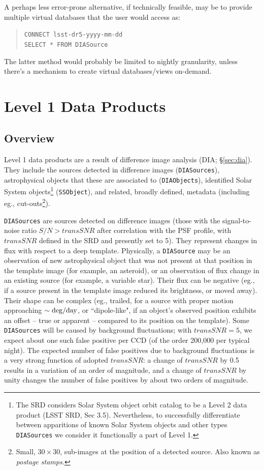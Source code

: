 \documentclass[12pt]{article}
\newcommand{\code}[1]{\texttt{#1}}
\newcommand{\DIASource}{\code{DIASource}\xspace}
\newcommand{\DIASources}{\code{DIASources}\xspace}
\newcommand{\DIAObjects}{\code{DIAObjects}\xspace}
\newcommand{\SSObject}{\code{SSObject}\xspace}
\newcommand{\transSNR}{5\xspace}
\newcommand{\req}[1]{\marginpar{\tiny #1}}
\begin{document}
A perhaps less error-prone alternative, if technically feasible, may be to provide multiple virtual databases that the user would access as:
%
\begin{quote}
\texttt{CONNECT lsst-dr5-yyyy-mm-dd} \\
\texttt{SELECT * FROM DIASource}
\end{quote}
%
The latter method would probably be limited to nightly granularity, unless there's a mechanism to create virtual databases/views on-demand.

\clearpage

\section{Level 1 Data Products}
\label{sec:level1}

\subsection{Overview}

Level 1 data products are a result of difference image analysis (DIA; \S \ref{sec:dia}). They include the sources detected in difference images (\DIASources), astrophysical objects that these are associated to (\DIAObjects), identified Solar System objects\footnote{The SRD considers Solar System object orbit catalog to be a Level 2 data product (LSST SRD, Sec 3.5). Nevertheless, to successfully differentiate between apparitions of known Solar System objects and other types \DIASources we consider it functionally a part of Level 1.} (\SSObject), and related, broadly defined, metadata (including eg., cut-outs\footnote{Small, $30 \times 30$, sub-images at the position of a detected source. Also known as {\em postage stamps.}}).

\DIASources are sources detected on difference images (those with the signal-to-noise ratio $S/N>transSNR$ after correlation with the PSF profile, with $transSNR$\req{transSNR} defined in the SRD and presently set to \transSNR). They represent changes in flux with respect to a deep template. Physically, a \DIASource may be an observation of new astrophysical object that was not present at that position in the template image (for example, an asteroid), or an observation of flux change in an existing source (for example, a variable star). Their flux can be negative (eg., if a source present in the template image reduced its brightness, or moved away). Their shape can be complex (eg., trailed, for a source with proper motion approaching $\sim {\rm deg}/{\rm day}$, or ``dipole-like", if an object's observed position exhibits an offset -- true or apparent -- compared to its position on the template).
Some \DIASources will be caused by background fluctuations; with $transSNR = \transSNR$,
we expect about one such false positive per CCD (of the order 200,000 per typical night). The expected number of false
positives due to background fluctuations is a very strong function of adopted $transSNR$: a change of $transSNR$ by 0.5
results in a variation of an order of magnitude, and a change of $transSNR$ by unity changes the number of false
positives by about two orders of magnitude.
\end{document}
